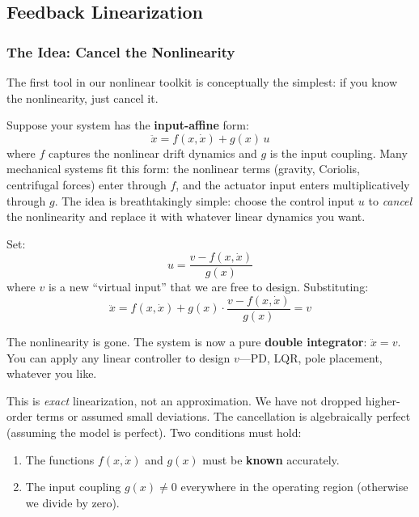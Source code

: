 \subsection{Feedback Linearization}

\subsubsection{The Idea: Cancel the Nonlinearity}

The first tool in our nonlinear toolkit is conceptually the simplest: if you know the nonlinearity, just cancel it.

Suppose your system has the \textbf{input-affine} form:
\begin{equation}
\ddot{x} = f(x, \dot{x}) + g(x)\,u
\end{equation}
where $f$ captures the nonlinear drift dynamics and $g$ is the input coupling. Many mechanical systems fit this form: the nonlinear terms (gravity, Coriolis, centrifugal forces) enter through $f$, and the actuator input enters multiplicatively through $g$. The idea is breathtakingly simple: choose the control input $u$ to \textit{cancel} the nonlinearity and replace it with whatever linear dynamics you want.

Set:
\begin{equation}
u = \frac{v - f(x, \dot{x})}{g(x)}
\end{equation}
where $v$ is a new ``virtual input'' that we are free to design. Substituting:
\begin{equation}
\ddot{x} = f(x, \dot{x}) + g(x) \cdot \frac{v - f(x, \dot{x})}{g(x)} = v
\end{equation}

The nonlinearity is gone. The system is now a pure \textbf{double integrator}: $\ddot{x} = v$. You can apply any linear controller to design $v$---PD, LQR, pole placement, whatever you like.

This is \textit{exact} linearization, not an approximation. We have not dropped higher-order terms or assumed small deviations. The cancellation is algebraically perfect (assuming the model is perfect). Two conditions must hold:
\begin{enumerate}[nosep]
    \item The functions $f(x, \dot{x})$ and $g(x)$ must be \textbf{known} accurately.
    \item The input coupling $g(x) \neq 0$ everywhere in the operating region (otherwise we divide by zero).
\end{enumerate}

